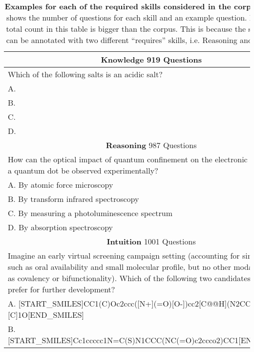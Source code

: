 \begin{table}
    \centering
    \small
    \caption{\textbf{Examples for each of the required skills considered in the \chembench corpus.} The table shows the number of questions for each skill and an example question. Note that the total count in this table is bigger than the \chembench corpus. This is because the same question can be annotated with two different \enquote{requires} skills, i.e. Reasoning and Calculation.} \\
    \label{tab:chembench_corpus_cognitive}
    {\fontsize{8}{9}\selectfont
        \begin{tabularx}{\textwidth}{X}
            \toprule
            \multicolumn{1}{c}{\textbf{Knowledge} 919 Questions} \\
            \midrule
            Which of the following salts is an acidic salt? \\
            A. \ce{NH4Cl} \\
            B. \ce{Na2CO3} \\
            C. \ce{NaH2PO4} \\
            D. \ce{Zn(OH)Cl} \\
            \midrule
            \multicolumn{1}{c}{\textbf{Reasoning} 987 Questions} \\
            \midrule
            How can the optical impact of quantum confinement on the electronic structure of a quantum dot be observed experimentally? \\
            A. By atomic force microscopy \\
            B. By transform infrared spectroscopy \\
            C. By measuring a photoluminescence spectrum \\
            D. By absorption spectroscopy \\
            \midrule
            \multicolumn{1}{c}{\textbf{Intuition} 1001 Questions} \\
            \midrule
            Imagine an early virtual screening campaign setting (accounting for simple aspects such as oral availability and small molecular profile, but no other modalities such as covalency or bifunctionality). Which of the following two candidates would you prefer for further development? \\
            A. [START\_SMILES]CC1(C)Oc2ccc([N+](=O)[O-])cc2[C@@H](N2CCOCC2)[C\@\@H]1O[END\_SMILES] \\
            B. [START\_SMILES]Cc1ccccc1N=C(S)N1CCC(NC\-(=O)c2ccco2)CC1[END\_SMILES] \\

\end{tabularx}}
\end{table}
